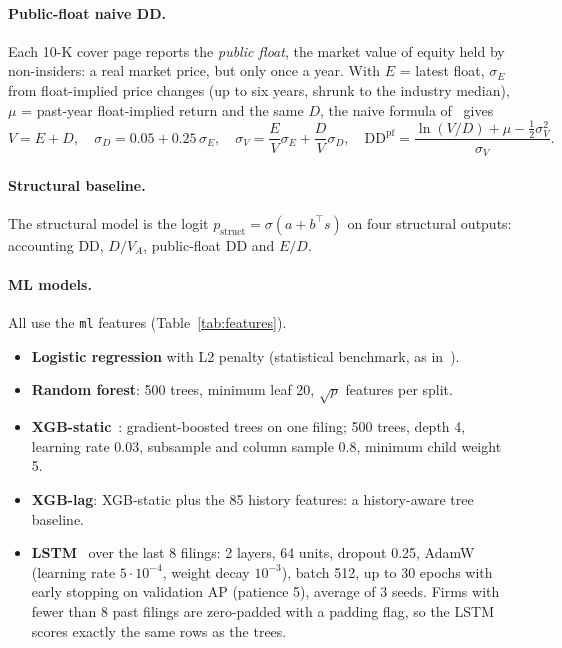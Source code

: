 \paragraph{Public-float naive DD.} Each 10-K cover page reports the \emph{public float}, the market value of
equity held by non-insiders: a real market price, but only once a year. With $E$ = latest float, $\sigma_E$
from float-implied price changes (up to six years, shrunk to the industry median), $\mu$ = past-year
float-implied return and the same $D$, the naive formula of~\cite{bharath2008} gives
\begin{equation}
  V = E + D,\quad \sigma_D = 0.05 + 0.25\,\sigma_E,\quad
  \sigma_V = \frac{E}{V}\sigma_E + \frac{D}{V}\sigma_D,\quad
  \mathrm{DD}^{\mathrm{pf}} = \frac{\ln(V/D) + \mu - \frac{1}{2}\sigma_V^2}{\sigma_V}.
  \label{eq:naive}
\end{equation}

\paragraph{Structural baseline.} The structural model is the logit $p_{\mathrm{struct}}=\sigma(a+b^\top s)$
on four structural outputs: accounting DD, $D/V_A$, public-float DD and $E/D$.

\paragraph{ML models.} All use the \texttt{ml} features (Table~\ref{tab:features}).
\begin{itemize}
  \item \textbf{Logistic regression} with L2 penalty (statistical benchmark, as in~\cite{moscatelli2020}).
  \item \textbf{Random forest}: 500 trees, minimum leaf 20, $\sqrt{p}$ features per split.
  \item \textbf{XGB-static}~\cite{chen2016xgboost}: gradient-boosted trees on one filing; 500 trees, depth 4,
        learning rate 0.03, subsample and column sample 0.8, minimum child weight 5.
  \item \textbf{XGB-lag}: XGB-static plus the 85 history features: a history-aware tree baseline.
  \item \textbf{LSTM}~\cite{hochreiter1997lstm} over the last 8 filings: 2 layers, 64 units, dropout 0.25,
        AdamW (learning rate $5\cdot10^{-4}$, weight decay $10^{-3}$), batch 512, up to 30 epochs with early
        stopping on validation AP (patience 5), average of 3 seeds. Firms with fewer than 8 past filings are
        zero-padded with a padding flag, so the LSTM scores exactly the same rows as the trees.
\end{itemize}

